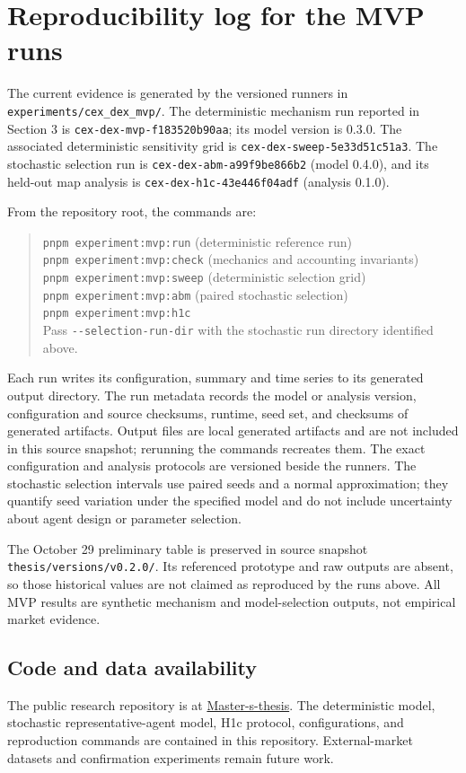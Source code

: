\section{Reproducibility log for the MVP runs}

The current evidence is generated by the versioned runners in
\texttt{experiments/cex\_dex\_mvp/}. The deterministic mechanism run reported in
Section 3 is \texttt{cex-dex-mvp-f183520b90aa}; its model version is 0.3.0. The
associated deterministic sensitivity grid is \texttt{cex-dex-sweep-5e33d51c51a3}.
The stochastic selection run is \texttt{cex-dex-abm-a99f9be866b2} (model 0.4.0),
and its held-out map analysis is \texttt{cex-dex-h1c-43e446f04adf} (analysis 0.1.0).

From the repository root, the commands are:

\begin{quote}
\texttt{pnpm experiment:mvp:run} (deterministic reference run)\\
\texttt{pnpm experiment:mvp:check} (mechanics and accounting invariants)\\
\texttt{pnpm experiment:mvp:sweep} (deterministic selection grid)\\
\texttt{pnpm experiment:mvp:abm} (paired stochastic selection)\\
\texttt{pnpm experiment:mvp:h1c}\\
Pass \texttt{-{}-selection-run-dir} with the stochastic run directory identified above.
\end{quote}

Each run writes its configuration, summary and time series to its generated output
directory. The run metadata records the model or
analysis version, configuration and source checksums, runtime, seed set, and checksums
of generated artifacts. Output files are local generated artifacts and are not included
in this source snapshot; rerunning the commands recreates them. The exact configuration
and analysis protocols are versioned beside the runners. The stochastic selection
intervals use paired seeds and a normal approximation; they quantify seed variation
under the specified model and do not include uncertainty about agent design or
parameter selection.

The October 29 preliminary table is preserved in source snapshot
\texttt{thesis/versions/v0.2.0/}. Its referenced prototype and raw outputs are absent,
so those historical values are not claimed as reproduced by the runs above. All MVP
results are synthetic mechanism and model-selection outputs, not empirical market
evidence.

\subsection*{Code and data availability}

The public research repository is at
\href{https://github.com/edwardcalderon/Master-s-thesis}{Master-s-thesis}. The
deterministic model, stochastic representative-agent model, H1c protocol, configurations,
and reproduction commands are contained in this repository. External-market datasets
and confirmation experiments remain future work.
